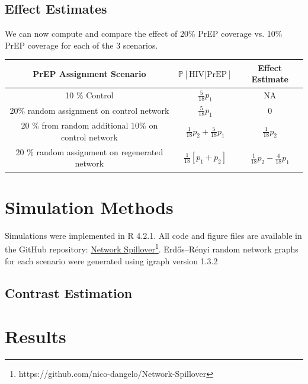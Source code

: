 \documentclass{article}
\theoremstyle{definition}
\begin{document}
\subsection{Effect Estimates}
We can now compute and compare the effect of 20\% PrEP coverage vs. 10\% PrEP coverage for each of the 3 scenarios.
\begin{center}
    \begin{tabular}{|c|c|c|}
    \hline
    PrEP Assignment Scenario     & $\mathbb{P}\left[\text{HIV} \vert \text{PrEP}\right]$ &  Effect Estimate  \\
         \hline
      10 \% Control   & $\frac{5}{18}p_{1}$ & NA\\
      \hline
      20\% random assignment on control network & $\frac{5}{18}p_{1}$ & 0 \\
      \hline
      20 \% from random additional 10\% on control network & $\frac{1}{18}p_{2}+\frac{5}{18}p_{1}$ & $\frac{1}{18}p_{2}$\\
      \hline
      20 \% random assignment on regenerated network & $\frac{1}{18}\left[p_{1}+p_{2}\right]$ & $\frac{1}{18}p_{2}-\frac{4}{18}p_{1}$\\
      \hline                 
    \end{tabular}                                      \end{center}
\section{Simulation Methods}
Simulations were implemented in R 4.2.1. All code and figure files are available in the GitHub repository: \href{https://github.com/nico-dangelo/Network-Spillover}{Network Spillover}\footnote{https://github.com/nico-dangelo/Network-Spillover}.
Erdős–Rényi random  network graphs for each scenario were generated using igraph version 1.3.2
\subsection{Contrast Estimation}

\section{Results}
\end{document}
